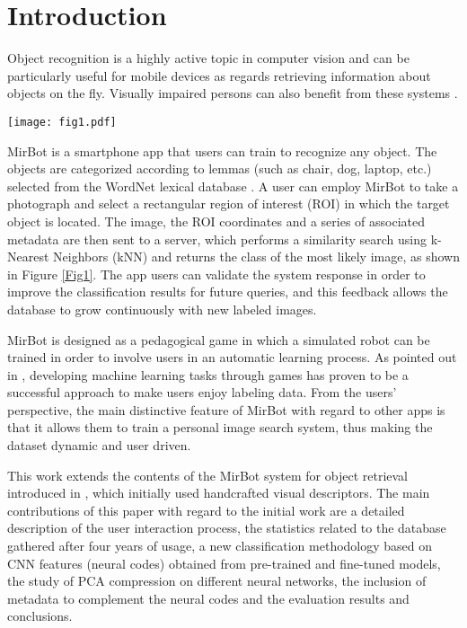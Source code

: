 \documentclass[final, twocolumn]{elsarticle}
\begin{document}
\ifarxiv
\else
\linenumbers
\fi


\section{Introduction}

Object recognition is a highly active topic in computer vision and can be particularly useful for mobile devices \citep{Bock2010IImage:IPhone, mobilenets} as regards retrieving information about objects on the fly. Visually impaired persons can also benefit from these systems \citep{Matusiak2013ObjectUsers}. 

\begin{figure*}%
\centering
\texttt{[image: fig1.pdf]}
\caption{\label{Fig1} Architecture of the iOS app. This example corresponds to the longest user interaction sequence. }
\end{figure*}

MirBot is a smartphone app that users can train to recognize any object. The objects are categorized according to lemmas (such as chair, dog, laptop, etc.) selected from the WordNet lexical database \citep{Fellbaum1998WordNet:Database}. A user can employ MirBot to take a photograph and select a rectangular region of interest (ROI) in which the target object is located. The image, the ROI coordinates and a series of associated metadata are then sent to a server, which performs a similarity search using k-Nearest Neighbors (kNN) and returns the class of the most likely image, as shown in Figure \ref{Fig1}. The app users can validate the system response in order to improve the classification results for future queries, and this feedback allows the database to grow continuously with new labeled images. 

MirBot is designed as a pedagogical game in which a simulated robot can be trained in order to involve users in an automatic learning process. As pointed out in \cite{Barrington2012Game-poweredLearning.,vonAhn2004LabelingGame}, developing machine learning tasks through games has proven to be a successful approach to make users enjoy labeling data. From the users' perspective, the main distinctive feature of MirBot with regard to other apps is that it allows them to train a personal image search system, thus making the dataset dynamic and user driven.

This work extends the contents of the MirBot system for object retrieval introduced in \cite{MirBot:System}, which initially used handcrafted visual descriptors. The main contributions of this paper with regard to the initial work are a detailed description of the user interaction process, the statistics related to the database gathered after four years of usage, a new classification methodology based on CNN features (neural codes) obtained from pre-trained and fine-tuned models, the study of PCA compression on different neural networks, the inclusion of metadata to complement the neural codes and the evaluation results and conclusions. 
\end{document}
